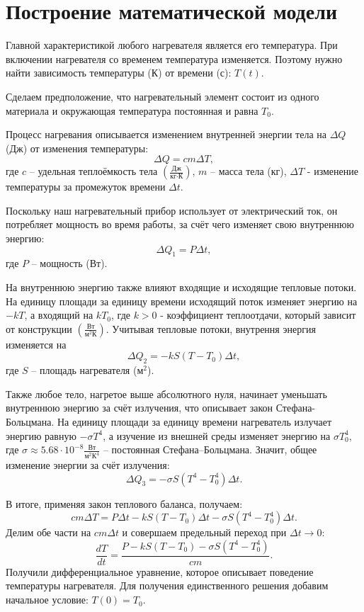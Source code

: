  \section{Построение математической модели}
    Главной характеристикой любого нагревателя является его температура. При включении нагревателя со временем температура изменяется. Поэтому нужно найти зависимость температуры (К) от времени (с): $ T(t) $.

    Сделаем предположение, что нагревательный элемент состоит из одного материала и окружающая температура постоянная и равна $T_0$.%
    
    Процесс нагревания описывается изменением внутренней энергии тела на $ \Delta Q $ (Дж) от изменения температуры:
    \[
        \Delta Q = cm \Delta T,
    \]
    где $c$ -- удельная теплоёмкость тела $\left(\frac{\text{Дж}}{\text{кг} \cdot \text{К}}\right)$, $m$ -- масса тела (кг), $ \Delta T $ - изменение температуры за промежуток времени $\Delta t$.

    Поскольку наш нагревательный прибор использует от электрический ток, он потребляет мощность во время работы, за счёт чего изменяет свою внутреннюю энергию:
    \[
        \Delta Q_1 = P \Delta t,
    \]
    где $P$ -- мощность (Вт). 

    На внутреннюю энергию также влияют входящие и исходящие тепловые потоки. На единицу площади за единицу времени исходящий поток изменяет энергию на $ -k T $, а входящий на $ k T_0 $, где $ k > 0$ - коэффициент теплоотдачи, который зависит от конструкции \( \left( \frac{\text{Вт}}{\text{м}^2 \text{К}} \right) \). Учитывая тепловые потоки, внутрення энергия изменяется на
    \[
        \Delta Q_2 = -k S (T - T_0) \Delta t,
    \]
    где $S$ -- площадь нагревателя ($\text{м}^2$).

    Также любое тело, нагретое выше абсолютного нуля, начинает уменьшать внутреннюю энергию за счёт излучения, что описывает закон Стефана-Больцмана. На единицу площади за единицу времени нагреватель излучает энергию равную $ -\sigma T^4 $, а изучение из внешней среды изменяет энергию на $ \sigma T_0^4 $, где $\sigma \approx 5.68 \cdot 10^{-8} \frac{\text{Вт}}{\text{м}^2 \text{К}^4}$ -- постоянная Стефана--Больцмана. Значит, общее изменение энергии за счёт излучения:
    \[
        \Delta Q_3 = -\sigma S (T^4 - T_0^4) \Delta t.
    \]


    В итоге, применяя закон теплового баланса, получаем:
    \[
        cm\Delta T = P \Delta t - k S (T - T_0) \Delta t - \sigma S (T^4 - T_0^4) \Delta t.
    \]
    Делим обе части на $ cm \Delta t $ и совершаем предельный переход при $ \Delta t \to 0 $:
    \[
        \frac{dT}{dt} = \frac{ P - k S (T - T_0) - \sigma S (T^4 - T_0^4) }{cm}.
    \]
    Получили дифференциальное уравнение, которое описывает поведение температуры нагревателя. Для получения единственного решения добавим начальное условие: \( T(0) = T_0 \).

